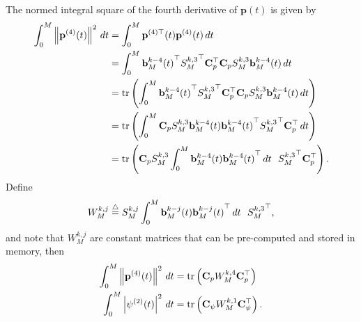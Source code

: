 The normed integral square of the fourth derivative of $\mathbf{p}(t)$ is given by
\begin{align*}
	\int_0^M \left\|\mathbf{p}^{(4)}(t)\right\|^2 \, dt
		&= 	\int_0^M \mathbf{p}^{(4)\top}(t)\mathbf{p}^{(4)}(t) \, dt \\
		&= 	\int_0^M 	{\mathbf{b}_M^{k-4}(t)}^\top {S_M^{k,3}}^\top 
				\mathbf{C}_p^\top \mathbf{C}_p S_M^{k,3} 	\mathbf{b}_M^{k-4}(t) \, dt \\
		&= 	\text{tr}\left(\int_0^M 	{\mathbf{b}_M^{k-4}(t)}^\top {S_M^{k,3}}^\top 
				\mathbf{C}_p^\top \mathbf{C}_p S_M^{k,3} 	\mathbf{b}_M^{k-4}(t) \, dt \right) \\
		&= 	\text{tr}\left(\int_0^M 	\mathbf{C}_p S_M^{k,3} 	\mathbf{b}_M^{k-4}(t) {\mathbf{b}_M^{k-4}(t)}^\top {S_M^{k,3}}^\top 
				\mathbf{C}_p^\top  \, dt \right) \\
		&= 	\text{tr}\left( \mathbf{C}_p S_M^{k,3} \int_0^M 	\mathbf{b}_M^{k-4}(t) {\mathbf{b}_M^{k-4}(t)}^\top \, dt~~ {S_M^{k,3}}^\top 
				\mathbf{C}_p^\top \right).
\end{align*}
Define
\[
W_M^{k,j} \stackrel{\triangle}{=} S_M^{k,j} \int_0^M 	\mathbf{b}_M^{k-j}(t) {\mathbf{b}_M^{k-j}(t)}^\top \, dt~~ {S_M^{k,3}}^\top,
\]
and note that $W_M^{k,j}$ are constant matrices that can be pre-computed and stored in memory,
then 
\begin{align*}
\int_0^M \left\|\mathbf{p}^{(4)}(t)\right\|^2 \, dt &= \text{tr}\left(\mathbf{C}_p W_M^{k,4} \mathbf{C}_p^\top \right) \\
\int_0^M \left|\psi^{(2)}(t)\right|^2 \, dt &= \text{tr}\left(\mathbf{C}_\psi W_M^{k,1} \mathbf{C}_\psi^\top \right).
\end{align*}

